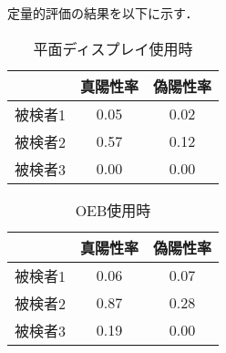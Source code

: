 定量的評価の結果を以下に示す．

\begin{table}[tp]
  \begin{center}
  \begin{tabular}{|c|c|c|}
  \hline
       & 真陽性率 & 偽陽性率 \\ \hline
  被検者1 & 0.05 & 0.02 \\ \hline
  被検者2 & 0.57 & 0.12 \\ \hline
  被検者3 & 0.00 & 0.00 \\ \hline
  \end{tabular}
  \caption{平面ディスプレイ使用時}\label{rate1}
\end{center}
\end{table}

\begin{table}[tp]
  \begin{center}
  \begin{tabular}{|c|c|c|}
  \hline
       & 真陽性率 & 偽陽性率 \\ \hline
  被検者1 & 0.06 & 0.07 \\ \hline
  被検者2 & 0.87 & 0.28 \\ \hline
  被検者3 & 0.19 & 0.00 \\ \hline
  \end{tabular}
  \caption{OEB使用時}\label{rate2}
\end{center}
\end{table}
